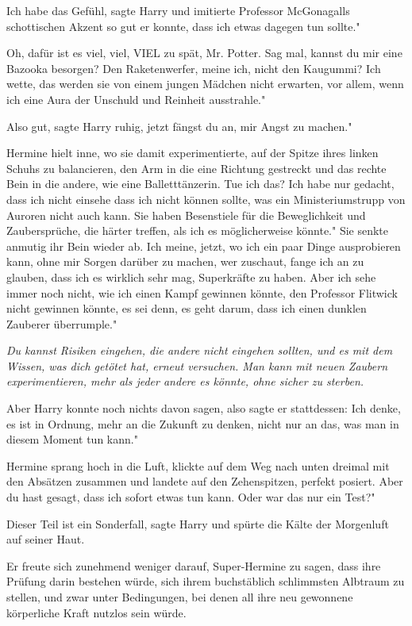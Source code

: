 \glqq{}Ich habe das Gefühl\grqq{}, sagte Harry und imitierte Professor
McGonagalls schottischen Akzent so gut er konnte, \glqq{}dass ich etwas dagegen
tun sollte."

\glqq{}Oh, dafür ist es viel, viel, VIEL zu spät, Mr. Potter. Sag mal, kannst du
mir eine Bazooka besorgen? Den Raketenwerfer, meine ich, nicht den Kaugummi? Ich
wette, das werden sie von einem jungen Mädchen nicht erwarten, vor allem, wenn
ich eine Aura der Unschuld und Reinheit ausstrahle."

\glqq{}Also gut\grqq{}, sagte Harry ruhig, \glqq{}jetzt fängst du an, mir Angst zu
machen."

Hermine hielt inne, wo sie damit experimentierte, auf der Spitze ihres linken
Schuhs zu balancieren, den Arm in die eine Richtung gestreckt und das rechte
Bein in die andere, wie eine Balletttänzerin. \glqq{}Tue ich das? Ich habe nur
gedacht, dass ich nicht einsehe dass ich nicht können sollte, was ein
Ministeriumstrupp von Auroren nicht auch kann. Sie haben Besenstiele für die
Beweglichkeit und Zaubersprüche, die härter treffen, als ich es möglicherweise
könnte." Sie senkte anmutig ihr Bein wieder ab. \glqq{}Ich meine, jetzt, wo ich
ein paar Dinge ausprobieren kann, ohne mir Sorgen darüber zu machen, wer
zuschaut, fange ich an zu glauben, dass ich es wirklich sehr mag, Superkräfte zu
haben. Aber ich sehe immer noch nicht, wie ich einen Kampf gewinnen könnte, den
Professor Flitwick nicht gewinnen könnte, es sei denn, es geht darum, dass ich
einen dunklen Zauberer überrumple."

\emph{Du kannst Risiken eingehen, die andere nicht eingehen sollten, und es mit
dem Wissen, was dich getötet hat, erneut versuchen. Man kann mit neuen Zaubern
experimentieren, mehr als jeder andere es könnte, ohne sicher zu sterben.}

Aber Harry konnte noch nichts davon sagen, also sagte er stattdessen: \glqq{}Ich
denke, es ist in Ordnung, mehr an die Zukunft zu denken, nicht nur an das, was
man in diesem Moment tun kann."

Hermine sprang hoch in die Luft, klickte auf dem Weg nach unten dreimal mit den
Absätzen zusammen und landete auf den Zehenspitzen, perfekt posiert. \glqq{}Aber
du hast gesagt, dass ich sofort etwas tun kann. Oder war das nur ein Test?"

\glqq{}Dieser Teil ist ein Sonderfall\grqq{}, sagte Harry und spürte die Kälte
der Morgenluft auf seiner Haut.

Er freute sich zunehmend weniger darauf, Super-Hermine zu sagen, dass ihre
Prüfung darin bestehen würde, sich ihrem buchstäblich schlimmsten Albtraum zu
stellen, und zwar unter Bedingungen, bei denen all ihre neu gewonnene
körperliche Kraft nutzlos sein würde.

